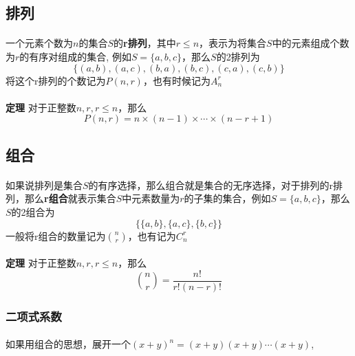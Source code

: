 \subsection{排列}

\paragraph{}
一个元素个数为$n$的集合$S$的\textbf{r排列}，其中$ r \leq n $，表示为将集合$ S $中的元素组成个数为$ r $的有序对组成的集合, 例如$S = \{a, b, c\}$，那么$S$的2排列为
$$
 \{(a, b), (a, c), (b, a), (b, c), (c, a), (c, b)\}
$$
将这个r排列的个数记为$P(n , r)$，也有时候记为$A_n^r$

\paragraph{}
\textbf{定理} 对于正整数$n, r, r \leq n$，那么
$$
P(n, r) = n \times (n - 1) \times \cdots \times (n - r + 1)
$$



\subsection{组合}
\paragraph{}
如果说排列是集合$S$的有序选择，那么组合就是集合的无序选择，对于排列的r排列，那么\textbf{r组合}就表示集合$S$中元素数量为$r$的子集的集合，例如$S = \{a, b, c\}$，那么$S$的2组合为
$$
\{ \{a, b\}, \{a, c\}, \{b,c\} \}
$$
一般将r组合的数量记为${n \choose r }$，也有记为$C_n^r$

\paragraph{}
\textbf{定理} 对于正整数$n, r, r \leq n$，那么
$$
{n \choose r} = \frac{n!}{r!(n-r)!}
$$

\subsubsection{二项式系数}
\paragraph{}
如果用组合的思想，展开一个$(x + y)^n = (x+y)(x+y)\cdots(x+y)$,  

